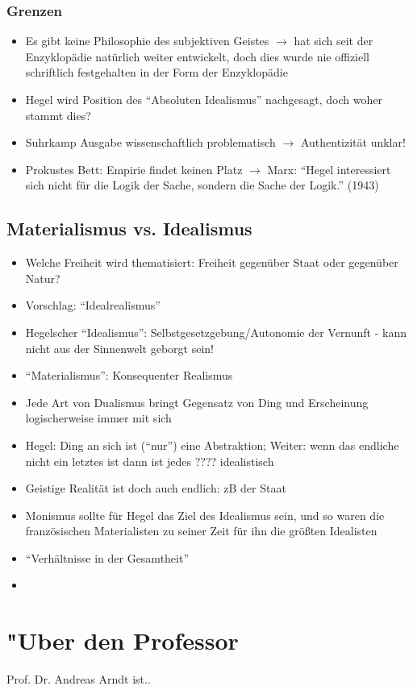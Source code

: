 \documentclass[emulatestandardclasses]{scrartcl}
\begin{document}
\subsubsection{Grenzen}

\begin{itemize}
  \item Es gibt keine Philosophie des subjektiven Geistes $\rightarrow$ hat sich seit der Enzyklopädie natürlich weiter entwickelt, doch dies wurde nie offiziell schriftlich festgehalten in der Form der Enzyklopädie
  \item Hegel wird Position des "`Absoluten Idealismus"' nachgesagt, doch woher stammt dies?
  \item Suhrkamp Ausgabe wissenschaftlich problematisch $\rightarrow$ Authentizität unklar! 
  \item Prokustes Bett: Empirie findet keinen Platz $\rightarrow$ Marx: "`Hegel interessiert sich nicht für die Logik der Sache, sondern die Sache der Logik."' (1943)
\end{itemize}

\subsection{Materialismus vs. Idealismus}

\begin{itemize}
  \item Welche Freiheit wird thematisiert: Freiheit gegenüber Staat oder gegenüber Natur?
  \item Vorschlag: "`Idealrealismus"'
  \item Hegelscher "`Idealismus"': Selbstgesetzgebung/Autonomie der Vernunft - kann nicht aus der Sinnenwelt geborgt sein!
  \item "`Materialismus"': Konsequenter Realismus
  \item Jede Art von Dualismus bringt Gegensatz von Ding und Erscheinung logischerweise immer mit sich
  \item Hegel: Ding an sich ist ("`nur"') eine Abstraktion; Weiter: wenn das endliche nicht ein letztes ist dann ist jedes ???? idealistisch
  \item Geistige Realität ist doch auch endlich: zB der Staat
  \item Monismus sollte für Hegel das Ziel des Idealismus sein, und so waren die französischen Materialisten zu seiner Zeit für ihn die größten Idealisten
  \item "`Verhältnisse in der Gesamtheit"'
  \item 
\end{itemize}


\newpage
\section{"Uber den Professor}
Prof. Dr. Andreas Arndt ist..


\end{document}
